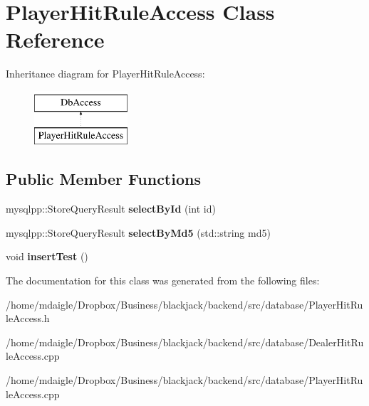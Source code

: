 \hypertarget{classPlayerHitRuleAccess}{
\section{\-Player\-Hit\-Rule\-Access \-Class \-Reference}
\label{d2/d2c/classPlayerHitRuleAccess}
}
\-Inheritance diagram for \-Player\-Hit\-Rule\-Access\-:\begin{figure}[H]
\begin{center}
\leavevmode
\includegraphics[height=2.000000cm]{d2/d2c/classPlayerHitRuleAccess}
\end{center}
\end{figure}
\subsection*{\-Public \-Member \-Functions}
\begin{DoxyCompactItemize}
\item 
\hypertarget{classPlayerHitRuleAccess_ac53503fea0430e2c337f95dcd3345673}{
mysqlpp\-::\-Store\-Query\-Result {\bfseries select\-By\-Id} (int id)}
\label{d2/d2c/classPlayerHitRuleAccess_ac53503fea0430e2c337f95dcd3345673}

\item 
\hypertarget{classPlayerHitRuleAccess_a30789188c00e0a353352b50360954c0b}{
mysqlpp\-::\-Store\-Query\-Result {\bfseries select\-By\-Md5} (std\-::string md5)}
\label{d2/d2c/classPlayerHitRuleAccess_a30789188c00e0a353352b50360954c0b}

\item 
\hypertarget{classPlayerHitRuleAccess_aec17c23694f6fd7e220f666e35cadebe}{
void {\bfseries insert\-Test} ()}
\label{d2/d2c/classPlayerHitRuleAccess_aec17c23694f6fd7e220f666e35cadebe}

\end{DoxyCompactItemize}


\-The documentation for this class was generated from the following files\-:\begin{DoxyCompactItemize}
\item 
/home/mdaigle/\-Dropbox/\-Business/blackjack/backend/src/database/\-Player\-Hit\-Rule\-Access.\-h\item 
/home/mdaigle/\-Dropbox/\-Business/blackjack/backend/src/database/\-Dealer\-Hit\-Rule\-Access.\-cpp\item 
/home/mdaigle/\-Dropbox/\-Business/blackjack/backend/src/database/\-Player\-Hit\-Rule\-Access.\-cpp\end{DoxyCompactItemize}
